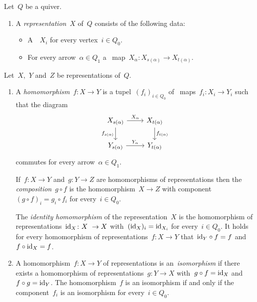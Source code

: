 \begin{remarkdefinition}
  Let~$Q$ be a quiver.
  \begin{enumerate}
    \item
      A \emph{representation}~$X$ of~$Q$ consists of the following data:
      \begin{itemize}
        \item
          A~{\module{$\kf$}}~$X_i$ for every vertex~$i \in Q_0$.
        \item
          For every arrow~$\alpha \in Q_1$ a~{\klin} map~$X_\alpha \colon X_{s(\alpha)} \to X_{t(\alpha)}$.
      \end{itemize}
  \end{enumerate}
  Let~$X$,~$Y$ and~$Z$ be representations of~$Q$.
  \begin{enumerate}[resume]
    \item
      A \emph{homomorphism}~$f \colon X \to Y$ is a tupel~$(f_i)_{i \in Q_0}$ of~{\klin} maps~$f_i \colon X_i \to Y_i$ such that the diagram
      \[
        \begin{tikzcd}
            X_{s(\alpha)}
            \arrow{r}[above]{X_\alpha}
            \arrow{d}[left]{f_{s(\alpha)}}
          & X_{t(\alpha)}
            \arrow{d}[right]{f_{t(\alpha)}}
          \\
            Y_{s(\alpha)}
            \arrow{r}[above]{Y_\alpha}
          & Y_{t(\alpha)}
        \end{tikzcd}
      \]
      commutes for every arrow~$\alpha \in Q_1$.
      
      If~$f \colon X \to Y$ and~$g \colon Y \to Z$ are homomorphisms of representations then the \emph{composition}~$g \circ f$ is the homomorphism~$X \to Z$ with component~$(g \circ f)_i = g_i \circ f_i$ for every~$i \in Q_0$.
      
      The \emph{identity homomorphism} of the representation~$X$ is the homomorphism of representations~$\id_X \colon X \to X$ with~$(\operatorname{id}_X)_i = \operatorname{id}_{X_i}$ for every~$i \in Q_0$.
      It holds for every homomorphism of representations~$f \colon X \to Y$ that~${\operatorname{id}_Y} \circ f = f$ and~$f \circ {\operatorname{id}_X} = f$.
    \item
      A homomorphism~$f \colon X \to Y$ of representations is an~\emph{isomorphism} if there exists a homomorphism of representations~$g \colon Y \to X$ with~$g \circ f = \operatorname{id}_X$ and~$f \circ g = \operatorname{id}_Y$.
      The homomorphism~$f$ is an isomorphism if and only if the component~$f_i$ is an isomorphism for every~$i \in Q_0$.
  \end{enumerate}
\end{remarkdefinition}


